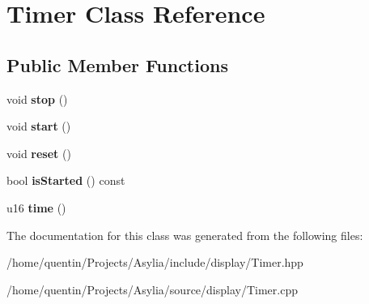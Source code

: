 \hypertarget{classTimer}{\section{Timer Class Reference}
\label{classTimer}
}
\subsection*{Public Member Functions}
\begin{DoxyCompactItemize}
\item 
\hypertarget{classTimer_a63f0eb44b27402196590a03781515dba}{void {\bfseries stop} ()}\label{classTimer_a63f0eb44b27402196590a03781515dba}

\item 
\hypertarget{classTimer_a3a8b5272198d029779dc9302a54305a8}{void {\bfseries start} ()}\label{classTimer_a3a8b5272198d029779dc9302a54305a8}

\item 
\hypertarget{classTimer_a9020542d73357a4eef512eefaf57524b}{void {\bfseries reset} ()}\label{classTimer_a9020542d73357a4eef512eefaf57524b}

\item 
\hypertarget{classTimer_a3d9d0ccaf75f0d3f797a8db267d0a7bb}{bool {\bfseries is\-Started} () const }\label{classTimer_a3d9d0ccaf75f0d3f797a8db267d0a7bb}

\item 
\hypertarget{classTimer_a250547797fd2a49df2f2b5f1667ddc79}{u16 {\bfseries time} ()}\label{classTimer_a250547797fd2a49df2f2b5f1667ddc79}

\end{DoxyCompactItemize}


The documentation for this class was generated from the following files\-:\begin{DoxyCompactItemize}
\item 
/home/quentin/\-Projects/\-Asylia/include/display/Timer.\-hpp\item 
/home/quentin/\-Projects/\-Asylia/source/display/Timer.\-cpp\end{DoxyCompactItemize}
